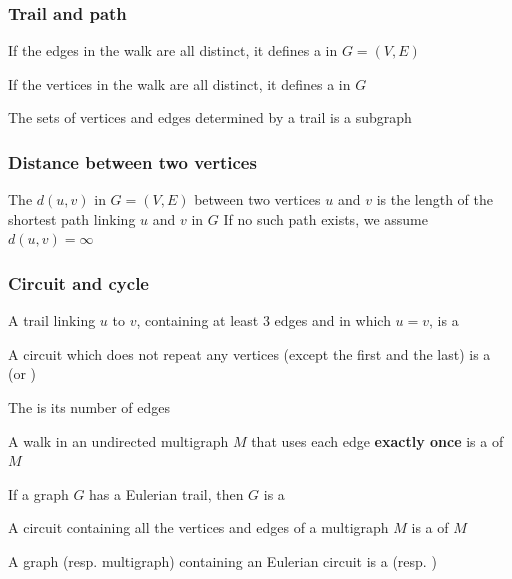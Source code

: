\documentclass[aspectratio=169]{beamer}\usepackage[]{graphicx}\usepackage[]{xcolor}
\begin{document}
\begin{frame}\frametitle{Trail and path}
\begin{definition}[{Trail}]
If the edges in the walk are all distinct, it defines a  in $G=(V,E)$
\end{definition}
\vfill
\begin{definition}[{Path}]\label{def:path}
If the vertices in the walk are all distinct, it defines a  in $G$
\end{definition}
\vfill
The sets of vertices and edges determined by a trail is a subgraph
\end{frame}


\begin{frame}\frametitle{Distance between two vertices}
\begin{definition}
The  $d(u,v)$ in $G=(V,E)$ between two vertices $u$ and $v$ is the length of the shortest path linking $u$ and $v$ in $G$
\vskip0.2cm
If no such path exists, we assume $d(u,v)=\infty$
\end{definition}
\end{frame}


\begin{frame}\frametitle{Circuit and cycle}
\begin{definition}[Circuit]
A trail linking $u$ to $v$, containing at least 3 edges and in which $u=v$, is a 
\end{definition}
\vfill
\begin{definition}[Cycle]\label{def:cycle}
A circuit which does not repeat any vertices (except the first and the last) is a  (or )
\end{definition}
\vfill
\begin{definition}
The  is its number of edges
\end{definition}
\end{frame}


\begin{frame}
\begin{definition}
	A walk in an undirected multigraph $M$ that uses each edge \textbf{exactly once} is a  of $M$
\end{definition}
\vfill
\begin{definition}
	If a graph $G$ has a Eulerian trail, then $G$ is a 
\end{definition}
\vfill
\begin{definition}
	A circuit containing all the vertices and edges of a multigraph $M$ is a  of $M$
\end{definition}
\vfill
\begin{definition}
	A graph (resp. multigraph) containing an Eulerian circuit is a  (resp. )
\end{definition}
\end{frame}
\end{document}
